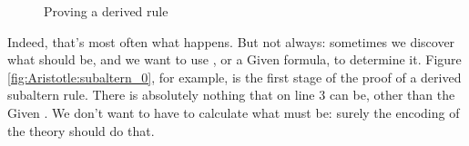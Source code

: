 \begin{figure}
{\label{fig:Aristotle:subaltern_1}}
\caption{Proving a derived rule}
\label{fig:Aristotle:subaltern_various}
\end{figure}
Indeed, that's most often what happens. But not always: sometimes we discover what  should be, and we want to use , or a Given formula, to determine it. Figure \ref{fig:Aristotle:subaltern_0}, for example, is the first stage of the proof of a derived subaltern rule. There is absolutely nothing that  on line 3 can be, other than the Given . We don't want to have to calculate what  must be: surely the encoding of the theory should do that. 

